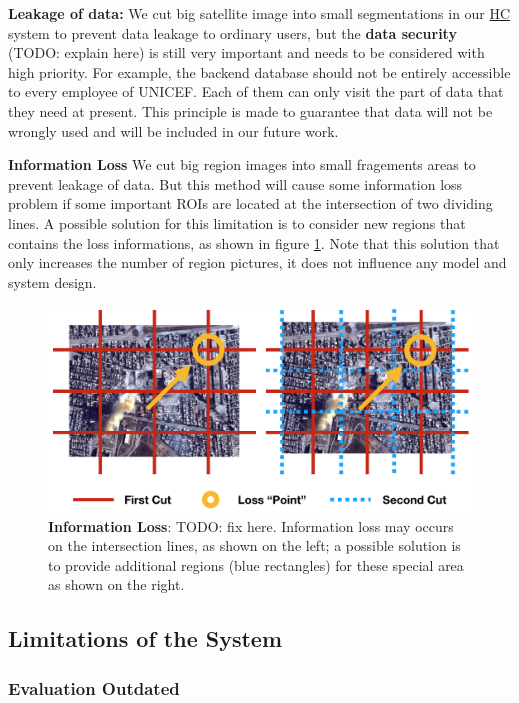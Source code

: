 \textbf{Leakage of data:} 
We cut big satellite image into small segmentations in our \hyperref[idx:hc]{HC} system to prevent data leakage to ordinary users, 
but the \textbf{data security} (TODO: explain here) is still very important and needs to be considered with high priority. For example, 
the backend database should not be entirely accessible to every employee of UNICEF. 
Each of them can only visit the part of data that they need at present. This principle is made to guarantee 
that data will not be wrongly used and will be included in our future work.

\textbf{Information Loss}
We cut big region images into small fragements areas to prevent leakage of data. 
But this method will cause some information loss problem if some important ROIs are 
located at the intersection of two dividing lines.
A possible solution for this limitation is to consider new regions that contains the loss
informations, as shown in figure \ref{fig:information_loss}. Note that this solution that
only increases the number of region pictures, it does not influence any model and system design.

\begin{figure}[H]
\centering
\includegraphics[width=0.7\columnwidth]{figures/information_loss3}
\caption{\textbf{Information Loss}: TODO: fix here. Information loss may occurs on the intersection lines, as shown on the left; a possible solution
is to provide additional regions (blue rectangles) for these special area as shown on the right.}
\label{fig:information_loss}
\end{figure}

\subsection{Limitations of the System}

\subsubsection{Evaluation Outdated}

